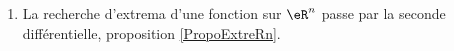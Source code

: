 \begin{enumerate}
    \item
        La recherche d'extrema d'une fonction sur \( \eR^n\) passe par la seconde différentielle, proposition \ref{PropoExtreRn}.
\end{enumerate}
